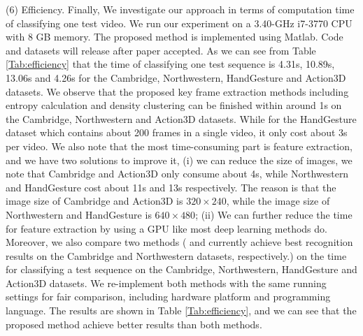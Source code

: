 \documentclass[5p]{elsarticle}
\begin{document}
\noindent (6) Efficiency.
Finally, We investigate our approach in terms of computation time of classifying one test video.
We run our experiment on a 3.40-GHz i7-3770 CPU with 8 GB memory.
The proposed method is implemented using Matlab.
Code and datasets will release after paper accepted.
As we can see from Table \ref{Tab:efficiency} that the time of classifying one test sequence is 4.31s, 10.89s, 13.06s and 4.26s for the Cambridge, Northwestern, HandGesture and Action3D datasets.
We observe that the proposed key frame extraction methods including entropy calculation and density clustering can be finished within around 1s on the Cambridge, Northwestern and Action3D datasets.
While for the HandGesture dataset which contains about 200 frames in a single video, it only cost about 3s per video. 
We also note that the most time-consuming part is feature extraction, and we have two solutions to improve it, (i) we can reduce the size of images, we note that Cambridge and Action3D only consume about 4s, while Northwestern and HandGesture cost about 11s and 13s respectively.
The reason is that the image size of Cambridge and Action3D is $320\times240$, while the image size of Northwestern and HandGesture is $640\times480$; (ii) We can further reduce the time for feature extraction by using a GPU like most deep learning methods do.
Moreover, we also compare two methods ( \cite{zhao2008information} and \cite{liu2013synthesis}  currently achieve best recognition results on the Cambridge and Northwestern datasets, respectively.) on the time for classifying a test sequence on the Cambridge, Northwestern, HandGesture and Action3D datasets.
We re-implement both methods with the same running settings for fair comparison, including hardware platform  and programming language.
The results are shown in Table \ref{Tab:efficiency}, and we can see that the proposed method achieve better results than both methods.
\end{document}
